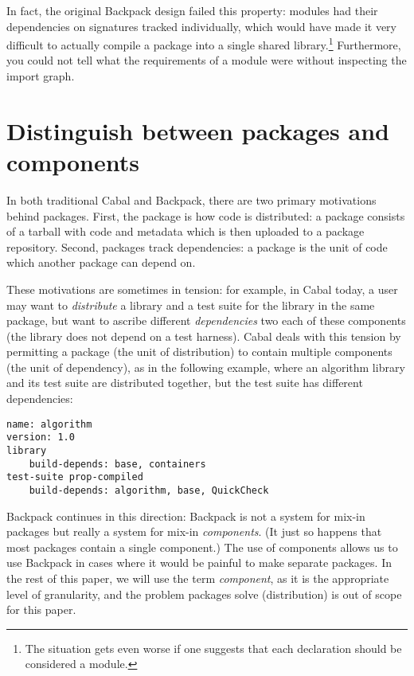 In fact, the original Backpack design failed this property: modules had
their dependencies on signatures tracked individually, which would have
made it very difficult to actually compile a package into a single
shared library.\footnote{The situation gets even worse if one suggests
that each declaration should be considered a module.}  Furthermore, you
could not tell what the requirements of a module were without inspecting
the import graph.

\section{Distinguish between packages and components}

In both traditional Cabal and Backpack, there are two primary
motivations behind packages.  First, the package is how code is
distributed: a package consists of a tarball with code and metadata
which is then uploaded to a package repository.  Second, packages track
dependencies: a package is the unit of code which another package can
depend on.

These motivations are sometimes in tension: for example, in Cabal today,
a user may want to \emph{distribute} a library and a test suite for the
library in the same package, but want to ascribe different
\emph{dependencies} two each of these components (the library does not
depend on a test harness).  Cabal deals with this tension by permitting
a package (the unit of distribution) to contain multiple components (the
unit of dependency), as in the following example, where an algorithm
library and its test suite are distributed together, but the test suite
has different dependencies:

\begin{verbatim}
name: algorithm
version: 1.0
library
    build-depends: base, containers
test-suite prop-compiled
    build-depends: algorithm, base, QuickCheck
\end{verbatim}

Backpack continues in this direction: Backpack is not a system for
mix-in packages but really a system for mix-in \emph{components}.  (It
just so happens that most packages contain a single component.) The use
of components allows us to use Backpack in cases where it would be
painful to make separate packages.  In the rest of this paper, we will
use the term \emph{component},  as it is the appropriate level of
granularity, and the problem packages solve (distribution) is out of
scope for this paper.

